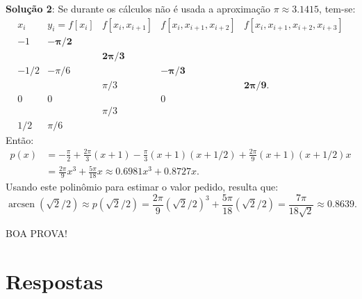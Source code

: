 \documentclass[12pt,a4paper]{article}
\newcommand*\arcsen{\operatorname{arcsen}}
\begin{document}
\begin{ExerciseList}
\textbf{Solução 2}: Se durante os cálculos não é usada a aproximação $\pi \approx 3.1415$, tem-se:
\[
	\begin{array}{cccccc}
   x_i & y_i=f[x_i] & f[x_i,x_{i+1}] & f[x_i,x_{i+1},x_{i+2}]  & f[x_i,x_{i+1},x_{i+2},x_{i+3}] \\
   -1 & \mathbf{-\pi/2} \\
	    &     & \mathbf{2\pi/3} \\
 -1/2 & -\pi/6 &             & \mathbf{-\pi/3}\\
	    &     & \pi/3 &              & \mathbf{2\pi/9}. \\
	0 & 0 &             & 0\\
	    &     & \pi/3 \\
	1/2 & \pi/6
	\end{array}
\]
Então:
\begin{align*}
p(x)
&= -\frac{\pi}{2}
 + \frac{2\pi}{3}(x+1)
 - \frac{ \pi}{3}(x+1)(x+1/2)
 + \frac{2\pi}{9}(x+1)(x+1/2)x\\
&= \frac{2 \pi}{9} x^3 + \frac{5 \pi}{18} x
\approx 0.6981 x^3 + 0.8727 x.
\end{align*}
Usando este polinômio para estimar o valor pedido, resulta que:
\[
\arcsen\left(\sqrt{2}/2\right)
\approx p\left(\sqrt{2}/2\right)
= \frac{2 \pi}{9} \left(\sqrt{2}/2\right)^3 + \frac{5 \pi}{18} \left(\sqrt{2}/2\right)
= \frac{7\pi}{18 \sqrt{2}}
\approx 0.8639.
\]
\end{ExerciseList}

\vspace{0.4cm}
\begin{center}
BOA PROVA!
\end{center}

\newpage
\restoregeometry
\section*{Respostas}
\shipoutAnswer
\end{document}
